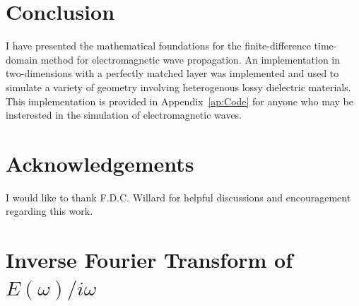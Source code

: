 \documentclass[12pt,twocolumn]{article}
\begin{document}
\section{Conclusion}
I have presented the mathematical foundations for the finite-difference time-domain method for electromagnetic wave propagation. An implementation in two-dimensions with a perfectly matched layer was implemented and used to simulate a variety of geometry involving heterogenous lossy dielectric materials. This implementation is provided in Appendix~\ref{ap:Code} for anyone who may be insterested in the simulation of electromagnetic waves.
\section*{Acknowledgements}
I would like to thank F.D.C. Willard for helpful discussions and encouragement regarding this work.



\newpage
\onecolumn
\appendix
\section{Inverse Fourier Transform of $E(\omega)/i\omega$}
\label{ap:fourier1}
\end{document}
